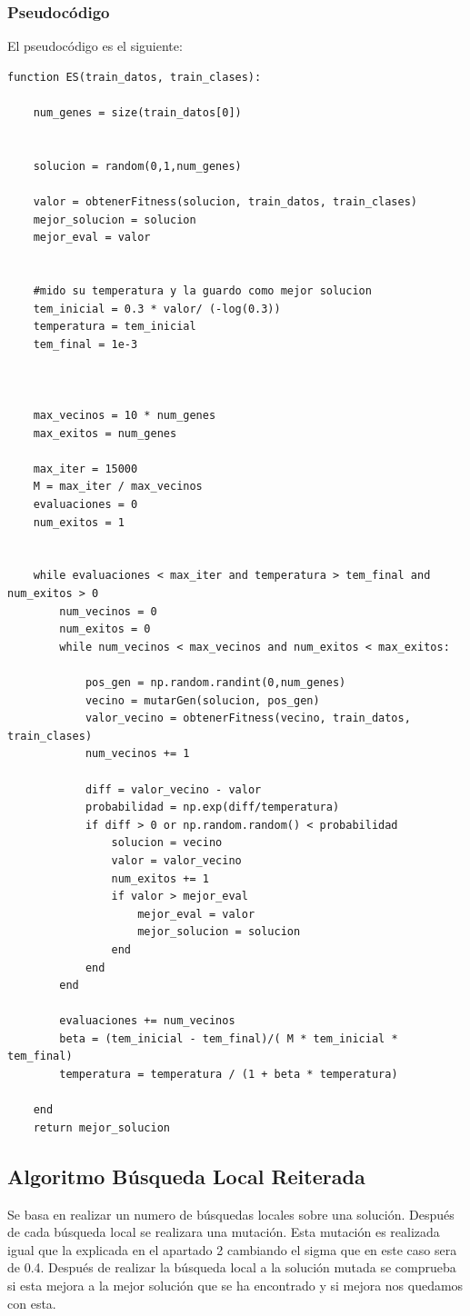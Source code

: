 \documentclass[titlepage]{article}
\begin{document}
	\subsubsection{Pseudocódigo}
	El pseudocódigo es el siguiente:
	\begin{lstlisting}
function ES(train_datos, train_clases):
	
	num_genes = size(train_datos[0])
	
	
	solucion = random(0,1,num_genes)   
	
	valor = obtenerFitness(solucion, train_datos, train_clases)
	mejor_solucion = solucion
	mejor_eval = valor
	
	
	#mido su temperatura y la guardo como mejor solucion    
	tem_inicial = 0.3 * valor/ (-log(0.3))
	temperatura = tem_inicial
	tem_final = 1e-3
	
	
	
	max_vecinos = 10 * num_genes
	max_exitos = num_genes
	
	max_iter = 15000
	M = max_iter / max_vecinos
	evaluaciones = 0
	num_exitos = 1
	
	
	while evaluaciones < max_iter and temperatura > tem_final and num_exitos > 0
		num_vecinos = 0
		num_exitos = 0
		while num_vecinos < max_vecinos and num_exitos < max_exitos:
		
			pos_gen = np.random.randint(0,num_genes)
			vecino = mutarGen(solucion, pos_gen)
			valor_vecino = obtenerFitness(vecino, train_datos, train_clases)
			num_vecinos += 1
			
			diff = valor_vecino - valor 
			probabilidad = np.exp(diff/temperatura)
			if diff > 0 or np.random.random() < probabilidad
				solucion = vecino
				valor = valor_vecino
				num_exitos += 1
				if valor > mejor_eval
					mejor_eval = valor
					mejor_solucion = solucion
				end
			end
		end
		
		evaluaciones += num_vecinos 
		beta = (tem_inicial - tem_final)/( M * tem_inicial * tem_final)
		temperatura = temperatura / (1 + beta * temperatura)

	end
	return mejor_solucion   

	\end{lstlisting}
	\newpage
	\subsection{Algoritmo Búsqueda Local Reiterada}
	Se basa en realizar un numero de búsquedas locales sobre una solución. Después de cada búsqueda local se realizara una mutación. Esta mutación es realizada igual que la explicada en el apartado 2 cambiando el sigma que en este caso sera de 0.4. Después de realizar la búsqueda local a la solución mutada se comprueba si esta mejora a la mejor solución que se ha encontrado y si mejora nos quedamos con esta.
	
\end{document}

